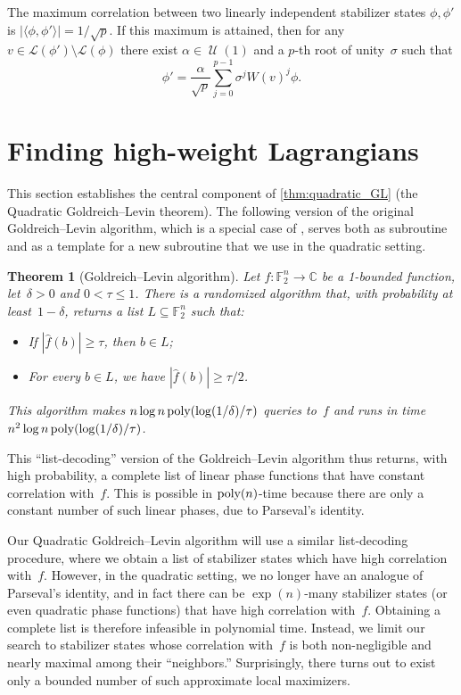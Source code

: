 \documentclass[11pt]{amsart}
\newcommand{\C}{\mathbb{C}} %
\newcommand{\F}{\mathbb{F}} %
\newcommand{\Lcal}{\mathcal{L}}
\DeclareMathOperator{\U}{\mathcal{U}}
\newcommand{\poly}{\mbox{\rm poly}}
\theoremstyle{plain}
\newtheorem{theorem}{Theorem}[section]
\theoremstyle{definition}
\theoremstyle{remark}
\begin{document}
The maximum correlation between two linearly independent stabilizer states $\phi, \phi'$ is $|\langle\phi, \phi'\rangle| = 1/\sqrt{p}$.
If this maximum is attained, then for any $v\in \Lcal(\phi')\setminus \Lcal(\phi)$ there exist $\alpha\in \U(1)$ and a $p$-th root of unity~$\sigma$ such that
$$\phi' = \frac{\alpha}{\sqrt{p}} \sum_{j=0}^{p-1} \sigma^j W(v)^j \phi.$$


\section{Finding high-weight Lagrangians}
\label{sec:finding_Lagrangians}

This section establishes the central component of \cref{thm:quadratic_GL} (the Quadratic Goldreich--Levin theorem).
The following version of the original Goldreich--Levin algorithm, which is a special case of \cite[Theorem~4.3]{kim2023cubic}, serves both as subroutine and as a template for a new subroutine that we use in the quadratic setting.

\begin{theorem}[Goldreich--Levin algorithm] \label{thm:GL}
    Let $f:\F_2^n\to \C$ be a 1-bounded function, let~$\delta>0$ and $0<\tau\leq 1$. 
    There is a randomized algorithm that, with probability at least~$1-\delta$, returns a list $L\subseteq \F_2^n$ such that:
    \begin{itemize}
        \item If $|\widehat{f}(b)| \geq \tau$, then $b\in L$;
        \item For every $b\in L$, we have $|\widehat{f}(b)| \geq \tau/2$.
    \end{itemize}
    This algorithm makes $n\log n\, \poly(\log(1/\delta)/\tau)$ queries to~$f$ and runs in time \\
    $n^2 \log n\, \poly(\log(1/\delta)/\tau)$.
\end{theorem}

This ``list-decoding'' version of the Goldreich--Levin algorithm thus returns, with high probability, a complete list of  linear phase functions that have constant correlation with~$f$.
This is possible in $\poly(n)$-time because there are only a constant number of such linear phases, due to Parseval's identity.

Our Quadratic Goldreich--Levin algorithm will use a similar list-decoding procedure, where we obtain a list of stabilizer states which have high correlation with~$f$.
However, in the quadratic setting, we no longer have an analogue of Parseval's identity, and in fact there can be $\exp(n)$-many stabilizer states (or even quadratic phase functions) that have high correlation with~$f$.
Obtaining a complete list is therefore infeasible in polynomial time.
Instead, we limit our search to stabilizer states whose correlation with~$f$ is both non-negligible and nearly maximal among their ``neighbors.''
Surprisingly, there turns out to exist only a bounded number of such approximate local maximizers.
\end{document}
